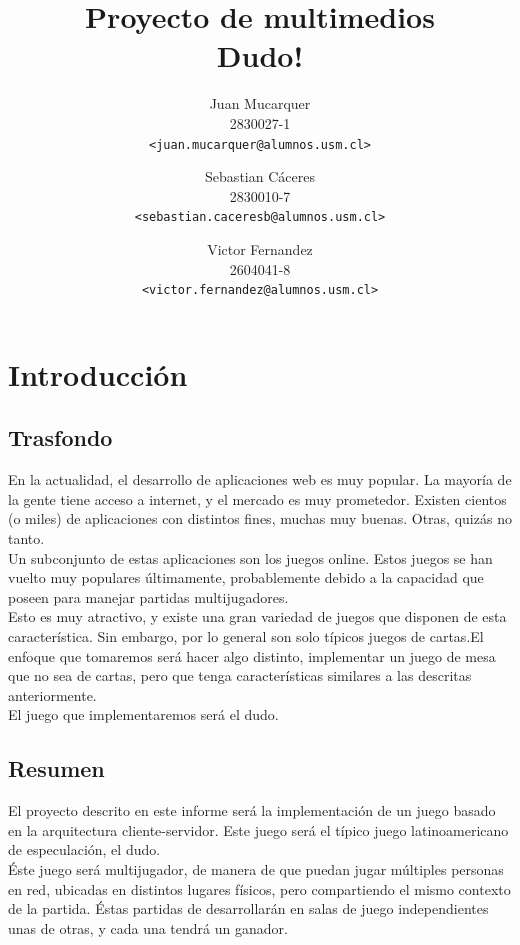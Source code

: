 \documentclass[a4paper,11pt]{article}
\title{Proyecto de multimedios\\Dudo!}
\author{Juan Mucarquer\\2830027-1\\\small{\texttt{<juan.mucarquer@alumnos.usm.cl>}} \and Sebastian Cáceres\\2830010-7\\\small{\texttt{<sebastian.caceresb@alumnos.usm.cl>}} \and Victor Fernandez\\2604041-8\\\small{\texttt{<victor.fernandez@alumnos.usm.cl>}}}
\begin{document}
%	
\maketitle

\newpage
\tableofcontents
\newpage

\section{Introducción}
\subsection{Trasfondo}
	En la actualidad, el desarrollo de aplicaciones web es muy popular. 
La mayoría de la gente tiene acceso a internet, y el mercado es muy prometedor.
Existen cientos (o miles) de aplicaciones con distintos fines, muchas muy 
buenas. Otras, quizás no tanto. \\

	Un subconjunto de estas aplicaciones son los juegos online. Estos 
juegos se han vuelto muy populares últimamente, probablemente debido a la
capacidad que poseen para manejar partidas multijugadores.\\

 Esto es muy atractivo, y existe una gran variedad de juegos que disponen 
de esta característica. Sin embargo, por lo general son solo típicos juegos 
de cartas.El enfoque que tomaremos será hacer algo distinto, implementar 
un juego de mesa que no sea de cartas, pero que tenga características 
similares a las descritas anteriormente. \\

El juego que implementaremos será el dudo.  
	

\subsection{Resumen}

	El proyecto descrito en este informe será la implementación de
un juego basado en la  arquitectura cliente-servidor. Este juego será 
el típico juego latinoamericano de especulación, el dudo.\\

	Éste juego será multijugador, de manera de que puedan jugar múltiples 
personas en red, ubicadas en distintos lugares físicos, pero compartiendo el
mismo contexto de la partida. Éstas partidas de desarrollarán en salas de 
juego independientes unas de otras, y cada una tendrá un ganador. \\
	
\end{document}
